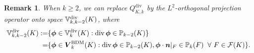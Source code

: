 \documentclass[10pt]{amsart}
\newtheorem{lemma}[theorem]{Lemma}
\newtheorem{remark}[theorem]{Remark}
\renewcommand{\div}{\operatorname{div}}
\numberwithin{equation}{section}
\begin{document}
\begin{remark}\rm
When $k\geq2$, we can replace $Q_{K,k}^{\div}$ by the $L^2$-orthogonal projection operator onto space $\mathbb{V}_{k,k-2}^{\rm div}(K)$, where
\begin{align*}
\mathbb{V}_{k,k-2}^{\rm div}(K):=&\{\boldsymbol{\phi}\in\mathbb{V}_{k}^{\rm div}(K): \div\boldsymbol{\phi}\in\mathbb P_{k-2}(K)\} \\
=&\{\boldsymbol{\phi}\in\boldsymbol{V}_{k}^{\mathrm{BDM}}(K): \div\boldsymbol{\phi}\in\mathbb P_{k-2}(K), \boldsymbol{\phi}\cdot\boldsymbol{n}|_F\in\mathbb P_{k}(F)\;\;\forall~F\in\mathcal F(K)\}.
\end{align*}
\end{remark}
\end{document}
